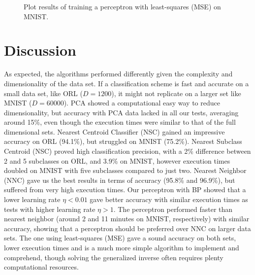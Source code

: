 \documentclass[journal]{IEEEtran}
\begin{document}
\begin{figure}[H]
	\centering
	\caption{Plot results of training a perceptron with least-squares (MSE) on MNIST.}
	\label{fig:mnistperceptronmse}
\end{figure}

\section{Discussion}

As expected, the algorithms performed differently given the complexity and dimensionality of the data set. If a classification scheme is fast and accurate on a small data set, like ORL ($D=1200$), it might not replicate on a larger set like MNIST ($D=60000$). PCA showed a computational easy way to reduce dimensionality, but accuracy with PCA data lacked in all our tests, averaging around 15\%, even though the execution times were similar to that of the full dimensional sets. Nearest Centroid Classifier (NSC) gained an impressive accuracy on ORL (94.1\%), but struggled on MNIST (75.2\%). Nearest Subclass Centroid (NSC) proved high classification precision, with a 2\% difference between 2 and 5 subclasses on ORL, and 3.9\% on MNIST, however execution times doubled on MNIST with five subclasses compared to just two. Nearest Neighbor (NNC) gave us the best results in terms of accuracy (95.8\% and 96.9\%), but suffered from very high execution times. Our perceptron with BP showed that a lower learning rate $\eta < 0.01$ gave better accuracy with similar execution times as tests with higher learning rate $\eta > 1$. The perceptron performed faster than nearest neighbor (around 2 and 11 minutes on MNIST, respectively) with similar accuracy, showing that a perceptron should be preferred over NNC on larger data sets. The one using least-squares (MSE) gave a sound accuracy on both sets, lower execution times and is a much more simple algorithm to implement and comprehend, though solving the generalized inverse often requires plenty computational resources.
\end{document}
